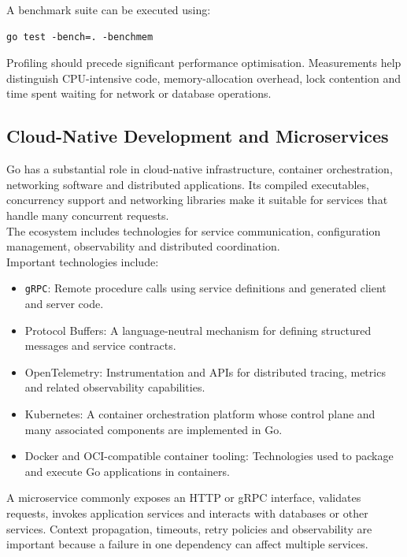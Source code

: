 A benchmark suite can be executed using:

\begin{lstlisting}
go test -bench=. -benchmem
\end{lstlisting}

Profiling should precede significant performance optimisation. Measurements help distinguish CPU-intensive code, memory-allocation overhead, lock contention and time spent waiting for network or database operations.

\subsection{Cloud-Native Development and Microservices}

Go has a substantial role in cloud-native infrastructure, container orchestration, networking software and distributed applications. Its compiled executables, concurrency support and networking libraries make it suitable for services that handle many concurrent requests.\\

The ecosystem includes technologies for service communication, configuration management, observability and distributed coordination.\\

Important technologies include:

\begin{itemize}
    \item \texttt{gRPC}: Remote procedure calls using service definitions and generated client and server code.
    \item Protocol Buffers: A language-neutral mechanism for defining structured messages and service contracts.
    \item OpenTelemetry: Instrumentation and APIs for distributed tracing, metrics and related observability capabilities.
    \item Kubernetes: A container orchestration platform whose control plane and many associated components are implemented in Go.
    \item Docker and OCI-compatible container tooling: Technologies used to package and execute Go applications in containers.
\end{itemize}

A microservice commonly exposes an HTTP or gRPC interface, validates requests, invokes application services and interacts with databases or other services. Context propagation, timeouts, retry policies and observability are important because a failure in one dependency can affect multiple services.\\

